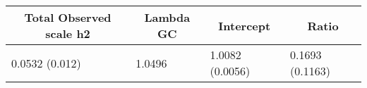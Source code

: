 \begin{center}
\begin{tabular}{llll}
\hline\hline
\multicolumn{1}{c}{Total Observed scale h2}&\multicolumn{1}{c}{Lambda GC}&\multicolumn{1}{c}{Intercept}&\multicolumn{1}{c}{Ratio}\tabularnewline
\hline
0.0532 (0.012)&1.0496&1.0082 (0.0056)&0.1693 (0.1163)\tabularnewline
\hline
\end{tabular}\end{center}
